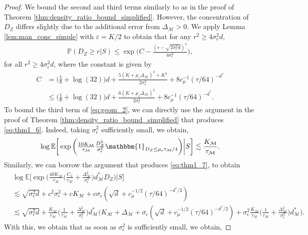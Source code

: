 \documentclass[10pt]{article}
\theoremstyle{plain}
\theoremstyle{definition}
\theoremstyle{remark}
\newcommand{\M}{{\mathcal{M}}}
\newcommand{\E}{\mathbb{E}}
\newcommand{\prob}{\mathbb{P}}
\newcommand{\gap}{\Delta_\M}
\begin{document}
\begin{proof}
We bound the second and third terms similarly to as in the proof of Theorem \ref{thm:density_ratio_bound_simplified}. However, the concentration of \(D_Z\) differs slightly due to the additional error from \(\gap > 0\). We apply Lemma \ref{lem:man_conc_simple} with \(\varepsilon = K/2\) to obtain that for any \(r^2 \geq 4 \sigma_\epsilon^2 d\),
\begin{align*}
    \prob(D_Z \geq r|S) \leq \exp \Big ( C - \tfrac{(r-\sqrt{2 \sigma_\epsilon^2 d})^2}{4 \sigma_\epsilon^2} \Big ),
\end{align*}
for all \(r^2 \geq 4 \sigma_\epsilon^2 d\), where the constant is given by
\begin{align*}
    C &= \big ( \tfrac{1}{8} + \log(32) \big ) d + \tfrac{5(K + \mu_\epsilon \gap)^2 + K^2}{2\sigma_\epsilon^2} + 8 c_\mu^{-1} (\tau/64)^{-d^*}\\
    &\leq  \big ( \tfrac{1}{8} + \log(32) \big ) d + \tfrac{6(K + \mu_\epsilon \gap)^2}{2\sigma_\epsilon^2} + 8 c_\mu^{-1} (\tau/64)^{-d^*}.
\end{align*}
To bound the third term of \eqref{eq:geom_2}, we can directly use the argument in the proof of Theorem \ref{thm:density_ratio_bound_simplified} that produces \eqref{eq:thm1_6}. Indeed, taking \(\sigma_\epsilon^2\) sufficiently small, we obtain,
\begin{equation*}
    \log \E \bigg [ \exp \bigg ( \tfrac{10 K_\M}{\tau_\M} \tfrac{D_Z^2}{\sigma^2_\epsilon} \mathbbm{1}_{D_Z \leq \mu_\epsilon \tau_\M/4} \bigg ) \bigg | S \bigg ] \lesssim \frac{K_\M}{\tau_\M}.
\end{equation*}
Similarly, we can borrow the argument that produces \eqref{eq:thm1_7}, to obtain
\begin{align*}
    &\log \E \bigg [ \exp \bigg ( \tfrac{40 K_\M}{\tau_\M} \Big ( \tfrac{C_3}{\tau_\M} + \tfrac{\gap^2}{\sigma^2_\epsilon} \Big ) d_\M^* D_Z \bigg ) \bigg | S \bigg ] \\
    &\lesssim \sqrt{\sigma_\epsilon^2 d} + c^2 \sigma_\epsilon^2 + cK_\M + c \sigma_\epsilon (\sqrt{d} + c_\mu^{-1/2} (\tau/64)^{-d^*/2})\\
    &\lesssim \sqrt{\sigma_\epsilon^2 d} + \frac{K_\M}{\tau_\M} \Big ( \tfrac{1}{\tau_\M} + \tfrac{\gap^2}{\sigma^2_\epsilon} \Big ) d_\M^* \bigg ( K_\M + \gap +  \sigma_\epsilon (\sqrt{d} + c_\mu^{-1/2} (\tau/64)^{-d^*/2}) + \sigma_\epsilon^2 \frac{K_\M}{\tau_\M} \Big ( \tfrac{1}{\tau_\M} + \tfrac{\gap^2}{\sigma^2_\epsilon} \Big ) d_\M^* \bigg ).
\end{align*}
With this, we obtain that as soon as \(\sigma_\epsilon^2\) is sufficiently small, we obtain,

\end{proof}
\end{document}
